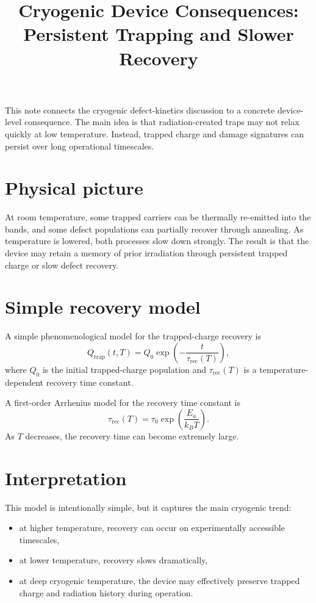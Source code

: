 \documentclass[11pt]{article}
\title{Cryogenic Device Consequences: Persistent Trapping and Slower Recovery}
\begin{document}
\maketitle

This note connects the cryogenic defect-kinetics discussion to a concrete device-level consequence. The main idea is that radiation-created traps may not relax quickly at low temperature. Instead, trapped charge and damage signatures can persist over long operational timescales.

\section*{Physical picture}
At room temperature, some trapped carriers can be thermally re-emitted into the bands, and some defect populations can partially recover through annealing. As temperature is lowered, both processes slow down strongly. The result is that the device may retain a memory of prior irradiation through persistent trapped charge or slow defect recovery.

\section*{Simple recovery model}
A simple phenomenological model for the trapped-charge recovery is
\[
Q_{\mathrm{trap}}(t,T) = Q_0 \exp\!\left(-\frac{t}{\tau_{\mathrm{rec}}(T)}\right),
\]
where $Q_0$ is the initial trapped-charge population and $\tau_{\mathrm{rec}}(T)$ is a temperature-dependent recovery time constant.

A first-order Arrhenius model for the recovery time constant is
\[
\tau_{\mathrm{rec}}(T) = \tau_0 \exp\!\left(\frac{E_a}{k_B T}\right).
\]
As $T$ decreases, the recovery time can become extremely large.

\section*{Interpretation}
This model is intentionally simple, but it captures the main cryogenic trend:
\begin{itemize}
    \item at higher temperature, recovery can occur on experimentally accessible timescales,
    \item at lower temperature, recovery slows dramatically,
    \item at deep cryogenic temperature, the device may effectively preserve trapped charge and radiation history during operation.
\end{itemize}
\end{document}
